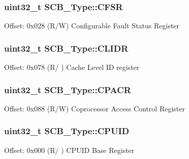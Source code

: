 \subsubsection[{\texorpdfstring{C\+F\+SR}{CFSR}}]{ uint32\+\_\+t S\+C\+B\+\_\+\+Type\+::\+C\+F\+SR}\hypertarget{structSCB__Type_a2f94bf549b16fdeb172352e22309e3c4}{}\label{structSCB__Type_a2f94bf549b16fdeb172352e22309e3c4}
Offset\+: 0x028 (R/W) Configurable Fault Status Register 
\subsubsection[{\texorpdfstring{C\+L\+I\+DR}{CLIDR}}]{ uint32\+\_\+t S\+C\+B\+\_\+\+Type\+::\+C\+L\+I\+DR}\hypertarget{structSCB__Type_a82963b2e0c2350e66778c4a8cfb9a2ef}{}\label{structSCB__Type_a82963b2e0c2350e66778c4a8cfb9a2ef}
Offset\+: 0x078 (R/ ) Cache Level ID register 
\subsubsection[{\texorpdfstring{C\+P\+A\+CR}{CPACR}}]{ uint32\+\_\+t S\+C\+B\+\_\+\+Type\+::\+C\+P\+A\+CR}\hypertarget{structSCB__Type_af460b56ce524a8e3534173f0aee78e85}{}\label{structSCB__Type_af460b56ce524a8e3534173f0aee78e85}
Offset\+: 0x088 (R/W) Coprocessor Access Control Register 
\subsubsection[{\texorpdfstring{C\+P\+U\+ID}{CPUID}}]{ uint32\+\_\+t S\+C\+B\+\_\+\+Type\+::\+C\+P\+U\+ID}\hypertarget{structSCB__Type_afa7a9ee34dfa1da0b60b4525da285032}{}\label{structSCB__Type_afa7a9ee34dfa1da0b60b4525da285032}
Offset\+: 0x000 (R/ ) C\+P\+U\+ID Base Register 
